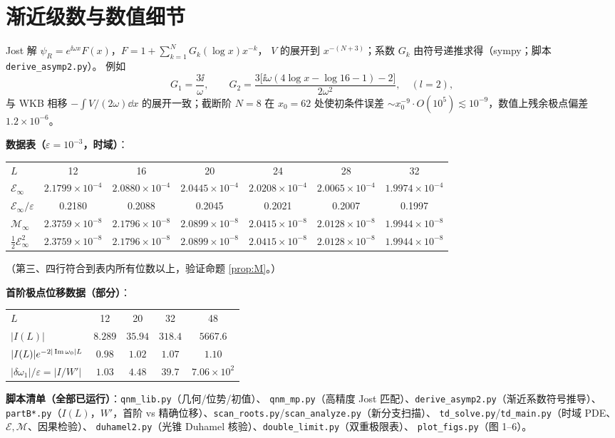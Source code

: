 \appendix

\section{渐近级数与数值细节}
\label{app:asymp}

Jost 解 $\psi_R=e^{\ii\omega x}F(x)$，$F=1+\sum_{k=1}^{N}G_k(\log x)x^{-k}$，
$V$ 的展开到 $x^{-(N+3)}$；系数 $G_k$ 由符号递推求得（sympy；脚本 \texttt{derive\_asymp2.py}）。
例如
\[
G_1=\frac{3\ii}{\omega},\qquad
G_2=\frac{3\big[\ii\omega(4\log x-\log16-1)-2\big]}{2\omega^2},\quad(l=2),
\]
与 WKB 相移 $-\!\int V/(2\omega)\dd x$ 的展开一致；截断阶 $N=8$ 在 $x_0=62$ 处使初条件误差
$\sim x_0^{-9}\!\cdot\!O(10^5)\lesssim10^{-9}$，数值上残余极点偏差 $1.2\times10^{-6}$。

\textbf{数据表（$\varepsilon=10^{-3}$，时域）}：
\begin{center}\small
\begin{tabular}{lcccccc}
\toprule
$L$ & 12 & 16 & 20 & 24 & 28 & 32\\
$\mathcal E_\infty$ & $2.1799\times10^{-4}$ & $2.0880\times10^{-4}$ & $2.0445\times10^{-4}$ & $2.0208\times10^{-4}$ & $2.0065\times10^{-4}$ & $1.9974\times10^{-4}$\\
$\mathcal E_\infty/\varepsilon$ & 0.2180 & 0.2088 & 0.2045 & 0.2021 & 0.2007 & 0.1997\\
$\mathcal M_\infty$ & $2.3759\times10^{-8}$ & $2.1796\times10^{-8}$ & $2.0899\times10^{-8}$ & $2.0415\times10^{-8}$ & $2.0128\times10^{-8}$ & $1.9944\times10^{-8}$\\
$\frac12\mathcal E_\infty^2$ & $2.3759\times10^{-8}$ & $2.1796\times10^{-8}$ & $2.0899\times10^{-8}$ & $2.0415\times10^{-8}$ & $2.0128\times10^{-8}$ & $1.9944\times10^{-8}$\\
\bottomrule
\end{tabular}
\end{center}
（第三、四行符合到表内所有位数以上，验证命题 \ref{prop:M}。）

\textbf{首阶极点位移数据（部分）}：
\begin{center}\small
\begin{tabular}{lcccc}
\toprule
$L$ & 12 & 20 & 32 & 48\\
$|I(L)|$ & $8.289$ & $35.94$ & $318.4$ & $5667.6$\\
$|I(L)|e^{-2|\operatorname{Im}\omega_0|L}$ & $0.98$ & $1.02$ & $1.07$ & $1.10$\\
$|\delta\omega_1|/\varepsilon=|I/W'|$ & $1.03$ & $4.48$ & $39.7$ & $7.06\times10^{2}$\\
\bottomrule
\end{tabular}
\end{center}

\textbf{脚本清单（全部已运行）}：\texttt{qnm\_lib.py}（几何/位势/初值）、
\texttt{qnm\_mp.py}（高精度 Jost 匹配）、\texttt{derive\_asymp2.py}（渐近系数符号推导）、
\texttt{partB*.py}（$I(L)$，$W'$，首阶 vs 精确位移）、\texttt{scan\_roots.py}/\texttt{scan\_analyze.py}（新分支扫描）、
\texttt{td\_solve.py}/\texttt{td\_main.py}（时域 PDE、$\mathcal E,\mathcal M$、因果检验）、
\texttt{duhamel2.py}（光锥 Duhamel 核验）、\texttt{double\_limit.py}（双重极限表）、
\texttt{plot\_figs.py}（图 1--6）。
